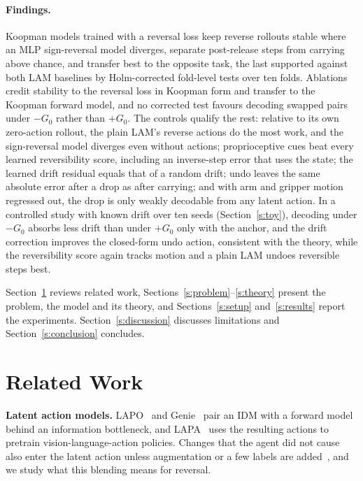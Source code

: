\documentclass{jcse}
\begin{document}
\paragraph{Findings.}
Koopman models trained with a reversal loss keep reverse rollouts stable where an MLP sign-reversal model diverges, separate post-release steps from carrying above chance, and transfer best to the opposite task, the last supported against both LAM baselines by Holm-corrected fold-level tests over ten folds.
Ablations credit stability to the reversal loss in Koopman form and transfer to the Koopman forward model, and no corrected test favours decoding swapped pairs under $-G_0$ rather than $+G_0$.
The controls qualify the rest: relative to its own zero-action rollout, the plain LAM's reverse actions do the most work, and the sign-reversal model diverges even without actions; proprioceptive cues beat every learned reversibility score, including an inverse-step error that uses the state; the learned drift residual equals that of a random drift; undo leaves the same absolute error after a drop as after carrying; and with arm and gripper motion regressed out, the drop is only weakly decodable from any latent action.
In a controlled study with known drift over ten seeds (Section~\ref{s:toy}), decoding under $-G_0$ absorbs less drift than under $+G_0$ only with the anchor, and the drift correction improves the closed-form undo action, consistent with the theory, while the reversibility score again tracks motion and a plain LAM undoes reversible steps best.

Section~\ref{s:related} reviews related work, Sections~\ref{s:problem}--\ref{s:theory} present the problem, the model and its theory, and Sections~\ref{s:setup} and~\ref{s:results} report the experiments. Section~\ref{s:discussion} discusses limitations and Section~\ref{s:conclusion} concludes.

\section{Related Work} \label{s:related}

\textbf{Latent action models.}
LAPO~\cite{schmidt2024lapo} and Genie~\cite{bruce2024genie} pair an IDM with a forward model behind an information bottleneck, and LAPA~\cite{ye2025lapa} uses the resulting actions to pretrain vision-language-action policies.
Changes that the agent did not cause also enter the latent action unless augmentation or a few labels are added~\cite{zhang2025lams}, and we study what this blending means for reversal.
\end{document}
